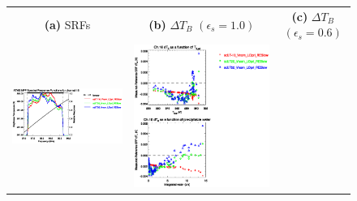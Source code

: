\begin{figure}[H]
  \centering
  \begin{tabular}{c c c}
    \textsf{\textbf{(a)} SRFs} &
    \textsf{\textbf{(b)} $\Delta T_B$ $(\epsilon_s = 1.0)$} &
    \textsf{\textbf{(c)} $\Delta T_B$ $(\epsilon_s = 0.6)$} \\
    \includegraphics[bb=80 400 280 558,clip,scale=0.85]{graphics/srf/Tset/atms_npp.ch16.osrf.eps} &
    \includegraphics[bb=85 400 260 558,clip,scale=0.85]{graphics/dtb/Tset/e1.0_r0.0/atms_npp.ch16.dTb.eps} & 

\end{tabular}
\end{figure}
